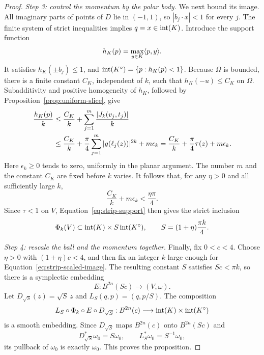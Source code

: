 \begin{proof}
\medskip
\noindent\textit{Step 3: control the momentum by the polar body.}
We next bound its image. All imaginary parts of points of $D$ lie in
$(-1,1)$, so $|b_j\cdot x|<1$ for every $j$. The finite system of
strict inequalities implies $q=x\in\operatorname{int}(K)$. Introduce the support
function
\[
 h_K(p)=\max_{y\in K}\langle p,y\rangle.
\]
It satisfies $h_K(\pm b_j)\le1$, and
$\operatorname{int}(K^\circ)=\{p:h_K(p)<1\}$. Because $\Omega$ is bounded,
there is a finite constant $C_K$, independent of $k$, such that
$h_K(-u)\le C_K$ on $\Omega$. Subadditivity and positive homogeneity of
$h_K$, followed by Proposition~\ref{prop:uniform-slice}, give
\begin{align}
 \frac{h_K(p)}{k}
 &\le \frac{C_K}{k}
       +\sum_{j=1}^m\frac{|J_k(v_j,t_j)|}{k}\notag\\
 &\le \frac{C_K}{k}
       +\frac{\pi}{4}\sum_{j=1}^m|g(\ell_j(z))|^{2k}
       +m\epsilon_k
  =\frac{C_K}{k}+\frac{\pi}{4}\tau(z)+m\epsilon_k.
 \label{eq:strip-support}
\end{align}
Here $\epsilon_k\ge0$ tends to zero, uniformly in the planar argument.
The number $m$ and the constant $C_K$ are fixed before $k$ varies.
It follows that, for any $\eta>0$ and all sufficiently large $k$,
\[
 \frac{C_K}{k}+m\epsilon_k<\frac{\eta\pi}{4}.
\]
Since $\tau<1$ on $V$, Equation~\eqref{eq:strip-support} then gives the
strict inclusion
\begin{equation}\label{eq:strip-scaled-image}
 \Phi_k(V)\subset
 \operatorname{int}(K)\times S\operatorname{int}(K^\circ),
 \qquad S=(1+\eta)\frac{\pi k}{4}.
\end{equation}

\medskip
\noindent\textit{Step 4: rescale the ball and the momentum together.}
Finally, fix $0<c<4$. Choose $\eta>0$ with $(1+\eta)c<4$, and then fix
an integer $k$ large enough for Equation~\eqref{eq:strip-scaled-image}.
The resulting constant $S$ satisfies $Sc<\pi k$, so there is a
symplectic embedding
\[
 E:B^{2n}(Sc)\longrightarrow(V,\omega).
\]
Let $D_{\sqrt S}(z)=\sqrt S\,z$ and
$L_S(q,p)=(q,p/S)$. The composition
\begin{equation}\label{eq:strip-rescaling}
 L_S\circ\Phi_k\circ E\circ D_{\sqrt S}:
 B^{2n}(c)\longrightarrow
 \operatorname{int}(K)\times\operatorname{int}(K^\circ)
\end{equation}
is a smooth embedding. Since $D_{\sqrt S}$ maps $B^{2n}(c)$ onto
$B^{2n}(Sc)$ and
\[
 D_{\sqrt S}^*\omega_0=S\omega_0,
 \qquad L_S^*\omega_0=S^{-1}\omega_0,
\]
its pullback of $\omega_0$ is exactly $\omega_0$. This proves the
proposition.
\end{proof}
